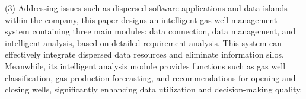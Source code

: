 \begin{englishabstract}
(3) Addressing issues such as dispersed software applications and data islands within the company, this paper designs an intelligent gas well management system containing three main modules: data connection, data management, and intelligent analysis, based on detailed requirement analysis. This system can effectively integrate dispersed data resources and eliminate information silos. Meanwhile, its intelligent analysis module provides functions such as gas well classification, gas production forecasting, and recommendations for opening and closing wells, significantly enhancing data utilization and decision-making quality. 
\end{englishabstract}
\XDUpremainmatter
